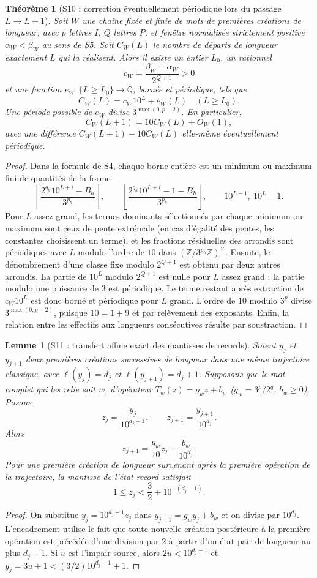 \documentclass[11pt,a4paper]{article}
\newtheorem{lemma}{Lemme}
\newtheorem{theorem}{Théorème}
\begin{document}
\begin{theorem}[S10 : correction éventuellement périodique lors du passage $L\to L+1$]
Soit $W$ une chaîne \emph{fixée} et finie de mots de premières créations de longueur, avec $p$ lettres $I$, $Q$ lettres $P$, et fenêtre normalisée strictement positive $\alpha_W<\beta_W$ au sens de S5. Soit $C_W(L)$ le nombre de départs de longueur exactement $L$ qui la réalisent. Alors il existe un entier $L_0$, un rationnel
\[
c_W=\frac{\beta_W-\alpha_W}{2^{Q+1}}>0
\]
et une fonction $e_W:\{L\ge L_0\}\to\mathbb Q$, \emph{bornée et périodique}, tels que
\[
\boxed{C_W(L)=c_W10^L+e_W(L)\quad(L\ge L_0).}
\]
Une période possible de $e_W$ divise $3^{\max(0,p-2)}$. En particulier,
\[
\boxed{C_W(L+1)=10C_W(L)+O_W(1),}
\]
avec une différence $C_W(L+1)-10C_W(L)$ elle-même éventuellement périodique.
\end{theorem}
\begin{proof}
Dans la formule de S4, chaque borne entière est un minimum ou maximum fini de quantités de la forme
\[\left\lceil\frac{2^{q_h}10^{L+i}-B_h}{3^{p_h}}\right\rceil,
\qquad\left\lfloor\frac{2^{q_h}10^{L+i}-1-B_h}{3^{p_h}}\right\rfloor,
\qquad10^{L-1},\ 10^L-1.
\]
Pour $L$ assez grand, les termes dominants sélectionnés par chaque minimum ou maximum sont ceux de pente extrémale (en cas d'égalité des pentes, les constantes choisissent un terme), et les fractions résiduelles des arrondis sont périodiques avec $L$ modulo l'ordre de $10$ dans $(\mathbb Z/3^{p_h}\mathbb Z)^\times$. Ensuite, le dénombrement d'une classe fixe modulo $2^{Q+1}$ est obtenu par deux autres arrondis. La partie de $10^L$ modulo $2^{Q+1}$ est nulle pour $L$ assez grand ; la partie modulo une puissance de $3$ est périodique. Le terme restant après extraction de $c_W10^L$ est donc borné et périodique pour $L$ grand. L'ordre de $10$ modulo $3^p$ divise $3^{\max(0,p-2)}$, puisque $10=1+9$ et par relèvement des exposants. Enfin, la relation entre les effectifs aux longueurs consécutives résulte par soustraction.
\end{proof}

\begin{lemma}[S11 : transfert affine exact des mantisses de records]
Soient $y_j$ et $y_{j+1}$ deux premières créations successives de longueur dans une même trajectoire classique, avec $\ell(y_j)=d_j$ et $\ell(y_{j+1})=d_j+1$. Supposons que le mot complet qui les relie soit $w$, d'opérateur $T_w(z)=g_wz+b_w$ ($g_w=3^p/2^q$, $b_w\ge0$). Posons
\[z_j=\frac{y_j}{10^{d_j-1}},\qquad z_{j+1}=\frac{y_{j+1}}{10^{d_j}}.\]
Alors
\[
\boxed{z_{j+1}=\frac{g_w}{10}z_j+\frac{b_w}{10^{d_j}}.}
\]
Pour une première création de longueur survenant après la première opération de la trajectoire, la mantisse de l'état record satisfait
\[
\boxed{1\le z_j<\frac32+10^{-(d_j-1)}.}
\]
\end{lemma}
\begin{proof}
On substitue $y_j=10^{d_j-1}z_j$ dans $y_{j+1}=g_wy_j+b_w$ et on divise par $10^{d_j}$. L'encadrement utilise le fait que toute nouvelle création postérieure à la première opération est précédée d'une division par $2$ à partir d'un état pair de longueur au plus $d_j-1$. Si $u$ est l'impair source, alors $2u<10^{d_j-1}$ et $y_j=3u+1<(3/2)10^{d_j-1}+1$.
\end{proof}
\end{document}
